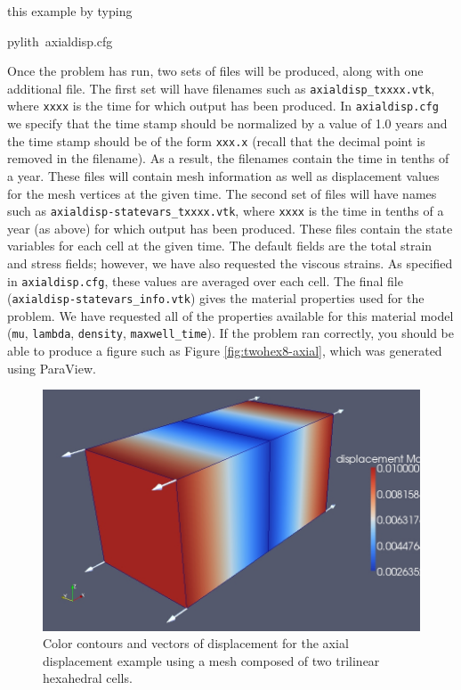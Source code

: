 this example by typing
\begin{lyxcode}
pylith~axialdisp.cfg
\end{lyxcode}
Once the problem has run, two sets of files will be produced, along
with one additional file. The first set will have filenames such as
\texttt{axialdisp\_txxxx.vtk}, where \texttt{xxxx} is the time for
which output has been produced. In \texttt{axialdisp.cfg} we specify
that the time stamp should be normalized by a value of 1.0 years and
the time stamp should be of the form \texttt{xxx.x} (recall that the
decimal point is removed in the filename). As a result, the filenames
contain the time in tenths of a year. These files will contain mesh
information as well as displacement values for the mesh vertices at
the given time. The second set of files will have names such as \texttt{axialdisp-statevars\_txxxx.vtk},
where \texttt{xxxx} is the time in tenths of a year (as above) for
which output has been produced. These files contain the state variables
for each cell at the given time. The default fields are the total
strain and stress fields; however, we have also requested the viscous
strains. As specified in \texttt{axialdisp.cfg}, these values are
averaged over each cell. The final file (\texttt{axialdisp-statevars\_info.vtk})
gives the material properties used for the problem. We have requested
all of the properties available for this material model (\texttt{mu},
\texttt{lambda}, \texttt{density}, \texttt{maxwell\_time}). If the
problem ran correctly, you should be able to produce a figure such
as Figure \vref{fig:twohex8-axial}, which was generated using ParaView.

\begin{figure}
\begin{centering}
\includegraphics[scale=0.33]{tutorials/twocells/figs/twohex8-axialdisp}
\par\end{centering}

\caption{Color contours and vectors of displacement for the axial displacement
example using a mesh composed of two trilinear hexahedral cells.\label{fig:twohex8-axial}}
\end{figure}



